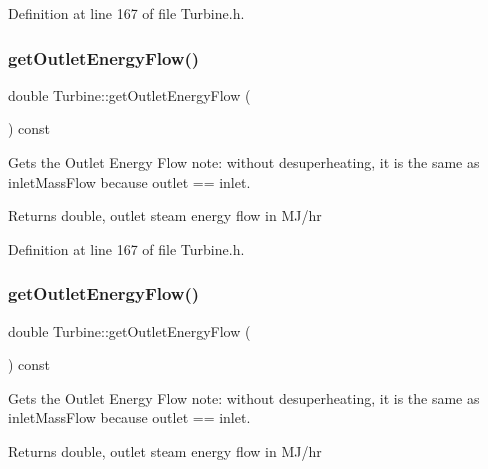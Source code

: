 Definition at line 167 of file Turbine.\+h.

\mbox{\label{class_turbine_aa20c0f9dd81cd9bfd5eda77f588516b5}} 
\subsubsection{\texorpdfstring{get\+Outlet\+Energy\+Flow()}{getOutletEnergyFlow()}\hspace{0.1cm}{\footnotesize\ttfamily [2/3]}}
{\footnotesize\ttfamily double Turbine\+::get\+Outlet\+Energy\+Flow (\begin{DoxyParamCaption}{ }\end{DoxyParamCaption}) const\hspace{0.3cm}{\ttfamily [inline]}}

Gets the Outlet Energy Flow note\+: without desuperheating, it is the same as inlet\+Mass\+Flow because outlet == inlet. \begin{DoxyReturn}{Returns}
double, outlet steam energy flow in M\+J/hr 
\end{DoxyReturn}


Definition at line 167 of file Turbine.\+h.

\mbox{\label{class_turbine_aa20c0f9dd81cd9bfd5eda77f588516b5}} 
\subsubsection{\texorpdfstring{get\+Outlet\+Energy\+Flow()}{getOutletEnergyFlow()}\hspace{0.1cm}{\footnotesize\ttfamily [3/3]}}
{\footnotesize\ttfamily double Turbine\+::get\+Outlet\+Energy\+Flow (\begin{DoxyParamCaption}{ }\end{DoxyParamCaption}) const\hspace{0.3cm}{\ttfamily [inline]}}

Gets the Outlet Energy Flow note\+: without desuperheating, it is the same as inlet\+Mass\+Flow because outlet == inlet. \begin{DoxyReturn}{Returns}
double, outlet steam energy flow in M\+J/hr 
\end{DoxyReturn}


